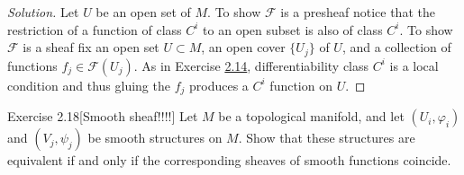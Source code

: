 \begin{proof}[Solution]\leavevmode
Let $U$ be an open set of $M$. To show $\mathcal{F}$ is a presheaf notice that the restriction of a function of class $C^i$ to an open subset is also of class $C^i$. To show $\mathcal{F}$ is a sheaf fix an open set $U \subset M$, an open cover $\{U_j\}$ of $U$, and a collection of functions $f_j \in \mathcal{F}(U_j)$. As in Exercise \hyperref[exer:2.14]{2.14}, differentiability class $C^i$ is a local condition and thus gluing the $f_j$ produces a $C^i$ function on $U$.
\end{proof}

\begin{thing4}{Exercise 2.18}[Smooth sheaf!!!!]\label{exer:2.18}\leavevmode
Let $M$ be a topological manifold, and let $(U_i,\varphi_i)$ and $(V_j,\psi_j)$ be smooth structures on $M$. Show that these structures are equivalent if and only if the corresponding sheaves of smooth functions coincide.
\end{thing4}

